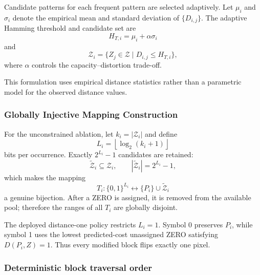 \documentclass[a4paper,fleqn]{cas-dc}
\newcommand{\RevisionAddBegin}{\begingroup}
\newcommand{\RevisionAddEnd}{\endgroup}
\newcommand{\RevisionAddBegin}{\begingroup\color{revisionblue}}
\newcommand{\RevisionAddEnd}{\endgroup}
\begin{document}
Candidate patterns for each frequent pattern are selected adaptively.
Let $\mu_i$ and $\sigma_i$ denote the empirical mean and standard deviation of $\{D_{i,j}\}$.
The adaptive Hamming threshold and candidate set are
\begin{equation}
H_{T,i}=\mu_i+\alpha\sigma_i
\label{eq:adaptive-threshold}
\end{equation}
and
\begin{equation}
\mathcal{Z}_i = \{ Z_j \in \mathcal{Z} \mid D_{i,j} \le H_{T,i} \},
\label{eq:adaptive-candidate-set}
\end{equation}
where $\alpha$ controls the capacity--distortion trade-off.

\RevisionAddBegin
This formulation uses empirical distance statistics rather than a parametric
model for the observed distance values.
\RevisionAddEnd

\subsubsection{Globally Injective Mapping Construction}

For the unconstrained ablation, let $k_i=|\mathcal{Z}_i|$ and define
\begin{equation}
L_i = \left\lfloor \log_2 (k_i + 1) \right\rfloor
\label{eq:bits-per-occurrence}
\end{equation}
bits per occurrence. Exactly $2^{L_i}-1$ candidates are retained:
\begin{equation}
\widetilde{\mathcal Z}_i\subseteq\mathcal Z_i,\qquad
|\widetilde{\mathcal Z}_i|=2^{L_i}-1,
\label{eq:retained-zero-set}
\end{equation}
which makes the mapping
\begin{equation}
T_i:\{0,1\}^{L_i}\longleftrightarrow
\{P_i\}\cup\widetilde{\mathcal Z}_i
\label{eq:local-bijection}
\end{equation}
a genuine bijection. After a ZERO is assigned, it is removed from the
available pool; therefore the ranges of all $T_i$ are globally disjoint.

The deployed distance-one policy restricts $L_i=1$. Symbol 0 preserves
$P_i$, while symbol 1 uses the lowest predicted-cost unassigned ZERO satisfying
$D(P_i,Z)=1$. Thus every modified block flips exactly one pixel.

\subsubsection*{Deterministic block traversal order}
\label{subsec:order}
\end{document}
